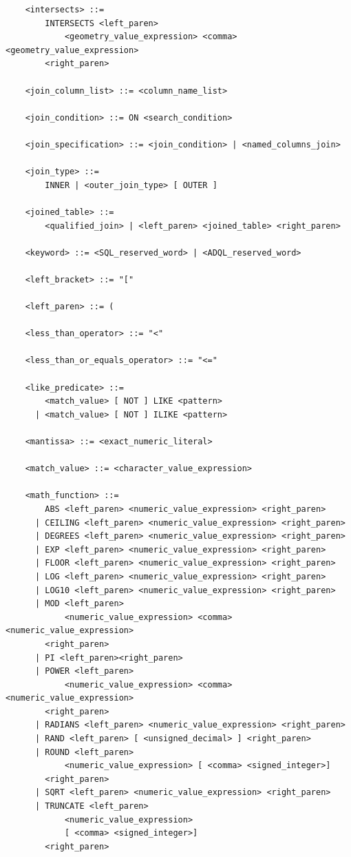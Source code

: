 \documentclass[11pt,a4paper]{ivoa}
\begin{document}
\begin{verbatim}
    <intersects> ::=
        INTERSECTS <left_paren>
            <geometry_value_expression> <comma> <geometry_value_expression>
        <right_paren>

    <join_column_list> ::= <column_name_list>

    <join_condition> ::= ON <search_condition>

    <join_specification> ::= <join_condition> | <named_columns_join>

    <join_type> ::=
        INNER | <outer_join_type> [ OUTER ]

    <joined_table> ::=
        <qualified_join> | <left_paren> <joined_table> <right_paren>

    <keyword> ::= <SQL_reserved_word> | <ADQL_reserved_word>

    <left_bracket> ::= "["

    <left_paren> ::= (

    <less_than_operator> ::= "<"

    <less_than_or_equals_operator> ::= "<="

    <like_predicate> ::=
        <match_value> [ NOT ] LIKE <pattern>
      | <match_value> [ NOT ] ILIKE <pattern>

    <mantissa> ::= <exact_numeric_literal>

    <match_value> ::= <character_value_expression>

    <math_function> ::=
        ABS <left_paren> <numeric_value_expression> <right_paren>
      | CEILING <left_paren> <numeric_value_expression> <right_paren>
      | DEGREES <left_paren> <numeric_value_expression> <right_paren>
      | EXP <left_paren> <numeric_value_expression> <right_paren>
      | FLOOR <left_paren> <numeric_value_expression> <right_paren>
      | LOG <left_paren> <numeric_value_expression> <right_paren>
      | LOG10 <left_paren> <numeric_value_expression> <right_paren>
      | MOD <left_paren>
            <numeric_value_expression> <comma> <numeric_value_expression>
        <right_paren>
      | PI <left_paren><right_paren>
      | POWER <left_paren>
            <numeric_value_expression> <comma> <numeric_value_expression>
        <right_paren>
      | RADIANS <left_paren> <numeric_value_expression> <right_paren>
      | RAND <left_paren> [ <unsigned_decimal> ] <right_paren>
      | ROUND <left_paren>
            <numeric_value_expression> [ <comma> <signed_integer>]
        <right_paren>
      | SQRT <left_paren> <numeric_value_expression> <right_paren>
      | TRUNCATE <left_paren>
            <numeric_value_expression>
            [ <comma> <signed_integer>]
        <right_paren>


\end{verbatim}
\end{document}
